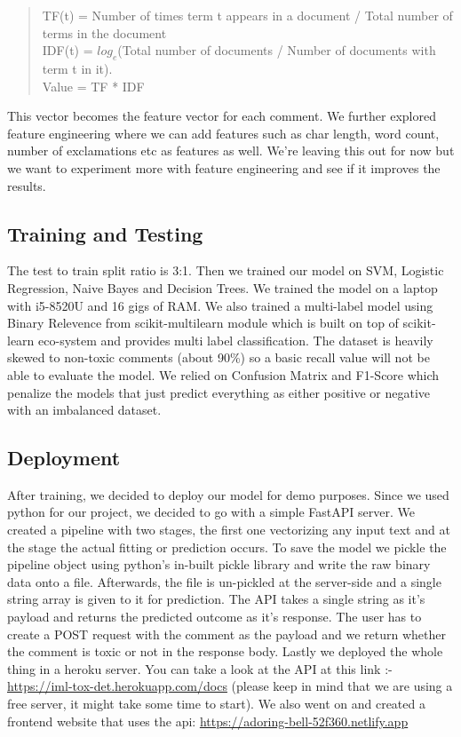 \documentclass[11pt]{article}
\begin{document}
\begin{quote}
TF(t) = Number of times term t appears in a document / Total number of terms in the document\\
IDF(t) = $log_e$(Total number of documents / Number of documents with term t in it). \\
Value = TF * IDF
\end{quote}
This vector becomes the feature vector for each comment. We further explored feature engineering where we can add features such as char length, word count, number of exclamations etc as features as well. We're leaving this out for now but we want to experiment more with feature engineering and see if it improves the results.

\subsection*{Training and Testing}
The test to train split ratio is 3:1. Then we trained our model on SVM, Logistic Regression, Naive Bayes and Decision Trees. We trained the model on a laptop with i5-8520U and 16 gigs of RAM. We also trained a multi-label model using Binary Relevence from scikit-multilearn module which is built on top of scikit-learn eco-system and provides multi label classification. 
The dataset is heavily skewed to non-toxic comments (about 90\%) so a basic recall value will not be able to evaluate the model. We relied on Confusion Matrix and F1-Score which penalize the  models that just predict everything as either positive or negative with an imbalanced dataset.\\

\subsection*{Deployment}
After training, we decided to deploy our model for demo purposes. 
Since we used python for our project, we decided to go with a simple FastAPI server.
We created a pipeline with two stages, the first one vectorizing any
input text and at the stage the actual fitting or prediction occurs. 
To save the model we pickle the pipeline object using python's in-built 
pickle library and write the raw binary data onto a file. 
Afterwards, the file is un-pickled at the server-side and a single string 
array is given to it for prediction. 
The API takes a single string as it's payload and returns the predicted outcome 
as it's response. The user has to create a POST request with the comment as the 
payload and we return whether the comment is toxic or not in the response body.
Lastly we deployed the whole thing in a heroku server.
You can take a look at the API at this link 
:- \url{https://iml-tox-det.herokuapp.com/docs}
(please keep in mind that we are using a free server, it might take some time to start). 
We also went on and created a frontend website that uses the api: 
\url{https://adoring-bell-52f360.netlify.app}
\end{document}
